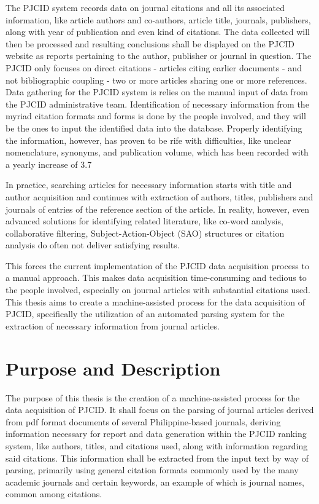 The PJCID system records data on journal citations and all its associated information, like article authors and co-authors, article title, journals, publishers, along with year of publication and even kind of citations. The data collected will then be processed and resulting conclusions shall be displayed on the PJCID website as reports pertaining to the author, publisher or journal in question. The PJCID only focuses on direct citations -   articles citing earlier documents - and not bibliographic coupling - two or more articles sharing one or more references. \cite{citation}
Data gathering for the PJCID system is relies on the manual input of data from the PJCID administrative team. Identification of necessary information from the myriad citation formats and forms is done by the people involved, and they will be the ones to input the identified data into the database. Properly identifying the information, however, has proven to be rife with difficulties, like unclear nomenclature, synonyms, and publication volume, which has been recorded with a yearly increase of 3.7%

In practice, searching articles for necessary information starts with title and author acquisition and continues with extraction of authors, titles, publishers and journals of entries of the reference section of the article. In reality, however, even advanced solutions for identifying related literature, like co-word analysis, collaborative filtering, Subject-Action-Object (SAO) structures or citation analysis do often not deliver satisfying results. \cite{sols} 

This forces the current implementation of the PJCID data acquisition process to a manual approach. This makes data acquisition time-consuming and tedious to the people involved, especially on journal articles with substantial citations used. This thesis aims to create a machine-assisted process for the data acquisition of PJCID, specifically the utilization of an automated parsing system for the extraction of necessary information from journal articles.

\section{Purpose and Description}
The purpose of this thesis is the creation of a machine-assisted process for the data acquisition of PJCID. It shall focus on the parsing of journal articles derived from pdf format documents of several Philippine-based journals, deriving information necessary for report and data generation within the PJCID ranking system, like authors, titles, and citations used, along with information regarding said citations. This information shall be extracted from the input text by way of parsing, primarily using general citation formats commonly used by the many academic journals and certain keywords, an example of which is journal names, common among citations. 

